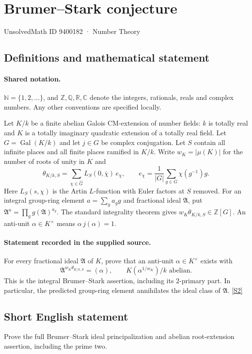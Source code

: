 \documentclass[11pt]{article}
\newcommand{\sref}[2]{\hyperlink{source:#1:#2}{[S#2]}}
\begin{document}
\setcounter{section}{9400181}
\section{Brumer–Stark conjecture}\label{9400182}
{\small\sffamily UnsolvedMath ID 9400182 · Number Theory}
\subsection{Definitions and mathematical statement}

\paragraph{Shared notation.}$\mathbb N=\{1,2,\ldots\}$, and $\mathbb Z,\mathbb Q,\mathbb R,\mathbb C$ denote the integers, rationals, reals and complex numbers. Any other conventions are specified locally.


Let $K/k$ be a finite abelian Galois CM-extension of number fields: $k$ is totally real and $K$ is a totally imaginary quadratic extension of a totally real field. Let $G=\operatorname{Gal}(K/k)$ and let $j\in G$ be complex conjugation. Let $S$ contain all infinite places and all finite places ramified in $K/k$. Write $w_K=|\mu(K)|$ for the number of roots of unity in $K$ and
\[\theta_{K/k,S}=\sum_{\chi\in\widehat G}L_S(0,\overline\chi)\,e_\chi,\qquad e_\chi=\frac1{|G|}\sum_{g\in G}\chi(g^{-1})g.\]
Here $L_S(s,\chi)$ is the Artin $L$-function with Euler factors at $S$ removed. For an integral group-ring element $a=\sum_g a_g g$ and fractional ideal $\mathfrak A$, put $\mathfrak A^a=\prod_g g(\mathfrak A)^{a_g}$. The standard integrality theorem gives $w_K\theta_{K/k,S}\in\mathbb Z[G]$. An anti-unit $\alpha\in K^\times$ means $\alpha\,j(\alpha)=1$.
\paragraph{Statement recorded in the supplied source.}
For every fractional ideal $\mathfrak A$ of $K$, prove that an anti-unit $\alpha\in K^\times$ exists with
\[\mathfrak A^{w_K\theta_{K/k,S}}=(\alpha),\qquad K(\alpha^{1/w_K})/k\text{ abelian}.\]
This is the integral Brumer--Stark assertion, including its $2$-primary part. In particular, the predicted group-ring element annihilates the ideal class of $\mathfrak A$. \sref{9400182}{2}
\subsection{Short English statement}
Prove the full Brumer--Stark ideal principalization and abelian root-extension assertion, including the prime two.
\end{document}
